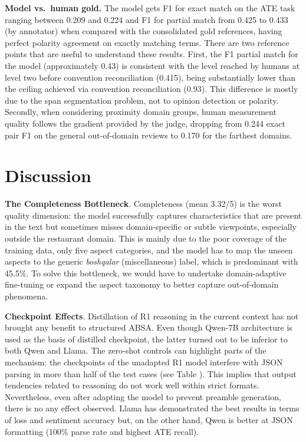 \documentclass[bdcc,article,submit,moreauthors]{Definitions/mdpi}
\begin{document}
\textbf{Model vs.\ human gold.} The model gets F1 for exact match on the ATE task ranging between 0.209 and 0.224 and F1 for partial match from 0.425 to 0.433 (by annotator) when compared with the consolidated gold references, having perfect polarity agreement on exactly matching terms. There are two reference points that are useful to understand these results. First, the F1 partial match for the model (approximately 0.43) is consistent with the level reached by humans at level two before convention reconciliation (0.415), being substantially lower than the ceiling achieved via convention reconciliation (0.93). This difference is mostly due to the span segmentation problem, not to opinion detection or polarity. Secondly, when considering proximity domain groups, human measurement quality follows the gradient provided by the judge, dropping from 0.244 exact pair F1 on the general out-of-domain reviews to 0.170 for the farthest domains.


\section{Discussion}
\label{sec:discussion}

\textbf{The Completeness Bottleneck}. Completeness (mean 3.32/5) is the worst quality dimension: the model successfully captures characteristics that are present in the text but sometimes misses domain-specific or subtle viewpoints, especially outside the restaurant domain. This is mainly due to the poor coverage of the training data, only five aspect categories, and the model has to map the unseen aspects to the generic \textit{boshqalar} (miscellaneous) label, which is predominant with 45.5\%. To solve this bottleneck, we would have to undertake domain-adaptive fine-tuning or expand the aspect taxonomy to better capture out-of-domain phenomena.

\textbf{Checkpoint Effects}. Distillation of R1 reasoning in the current context has not brought any benefit to structured ABSA. Even though Qwen-7B architecture is used as the basis of distilled checkpoint, the latter turned out to be inferior to both Qwen and Llama. The zero-shot controls can highlight parts of the mechanism: the checkpoints of the unadapted R1 model interfere with JSON parsing in more than half of the test cases (see Table ). This implies that output tendencies related to reasoning do not work well within strict formats. Nevertheless, even after adapting the model to prevent preamble generation, there is no any effect observed. Llama has demonstrated the best results in terms of loss and sentiment accuracy but, on the other hand, Qwen is better at JSON formatting (100\% parse rate and highest ATE recall).
\end{document}
